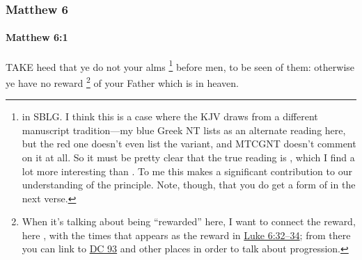 	\subsubsection{Matthew 6} %
		\label{MATTHEW-6}
		
		\paragraph{Matthew 6:1} %
			\label{MATTHEW-6-1}

			TAKE heed that ye do not your alms%
				\footnote{%
					 in SBLG. I think this is a case where the KJV draws from a different manuscript tradition---my blue Greek NT lists  as an alternate reading here, but the red one doesn't even list the variant, and MTCGNT doesn't comment on it at all. So it must be pretty clear that the true reading is , which I find a lot more interesting than . To me this makes a significant contribution to our understanding of the principle. Note, though, that you do get a form of  in the next verse.
					}
			before men, to be seen of them: otherwise ye have no reward%
				\footnote{%
					When it's talking about being ``rewarded'' here, I want to connect the reward, here , with the times that  appears as the reward in \hyperref[LUKE-6-32]{Luke 6:32--34}; from there you can link to \hyperref[DC93]{DC 93} and other places in order to talk about progression.
					}
			of your Father which is in heaven.

			\begin{framed}
			\scriptsize
				\begin{compactdesc}
					\item[SBLG]  \hyperref[DIKAIOSUNE]{} 
				\end{compactdesc}
			\end{framed}

